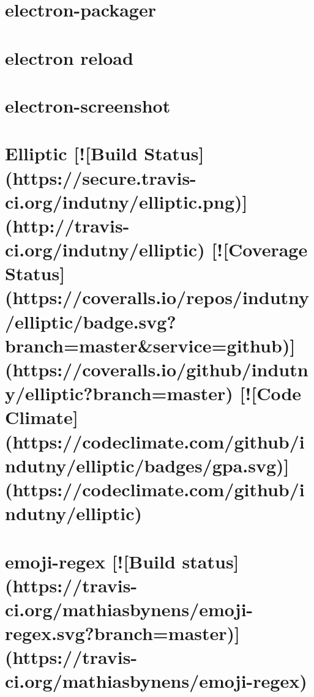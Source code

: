 \documentclass[twoside]{book}
\newcommand{\+}{\discretionary{\mbox{\scriptsize$\hookleftarrow$}}{}{}}
\begin{document}
\chapter{electron-\/packager}
\label{md_dsmacc_examples_DRmerge_node_modules_electron-packager_readme}

\chapter{electron reload}
\label{md_dsmacc_examples_DRmerge_node_modules_electron-reload_README}

\chapter{electron-\/screenshot}
\label{md_dsmacc_examples_DRmerge_node_modules_electron-screenshot_readme}

\chapter{Elliptic \mbox{[}!\mbox{[}Build Status\mbox{]}(https\+://secure.travis-\/ci.org/indutny/elliptic.png)\mbox{]}(http\+://travis-\/ci.org/indutny/elliptic) \mbox{[}!\mbox{[}Coverage Status\mbox{]}(https\+://coveralls.io/repos/indutny/elliptic/badge.svg?branch=master\&service=github)\mbox{]}(https\+://coveralls.io/github/indutny/elliptic?branch=master) \mbox{[}!\mbox{[}Code Climate\mbox{]}(https\+://codeclimate.com/github/indutny/elliptic/badges/gpa.svg)\mbox{]}(https\+://codeclimate.com/github/indutny/elliptic)}
\label{md_dsmacc_examples_DRmerge_node_modules_elliptic_README}

\chapter{emoji-\/regex \mbox{[}!\mbox{[}Build status\mbox{]}(https\+://travis-\/ci.org/mathiasbynens/emoji-\/regex.svg?branch=master)\mbox{]}(https\+://travis-\/ci.org/mathiasbynens/emoji-\/regex)}
\label{md_dsmacc_examples_DRmerge_node_modules_emoji-regex_README}

\end{document}
